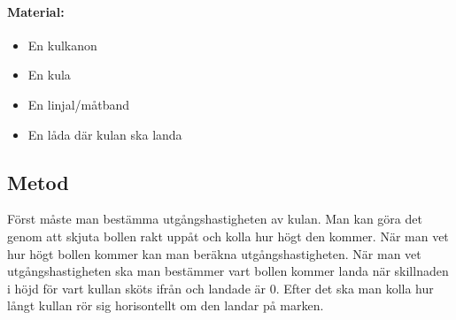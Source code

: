 \documentclass[11p]{article}
\begin{document}
    \paragraph{Material:}
    \begin{itemize}
        \item En kulkanon
        \item En kula
        \item En linjal/måtband
        \item En låda där kulan ska landa
    \end{itemize}
    \subsection{Metod}
    Först måste man bestämma utgångshastigheten av kulan.
    Man kan göra det genom att skjuta bollen rakt uppåt och kolla hur högt den kommer.
    När man vet hur högt bollen kommer kan man beräkna utgångshastigheten.
    När man vet utgångshastigheten ska man bestämmer vart bollen kommer landa när skillnaden i höjd för vart kullan sköts ifrån och landade är 0.
    Efter det ska man kolla hur långt kullan rör sig horisontellt om den landar på marken.
\end{document}
